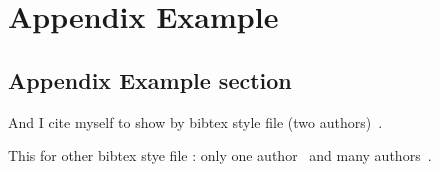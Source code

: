 
\chapter{Appendix Example}
\label{chap:appendix1}

\section{Appendix Example section}

And I cite myself to show by bibtex style file (two authors)~\cite{Commowick_MICCAI_2007}.

This for other bibtex stye file : only one author~\cite{Oakes_RStat_1999} and many authors~\cite{Guimond_CVIU_2000}.